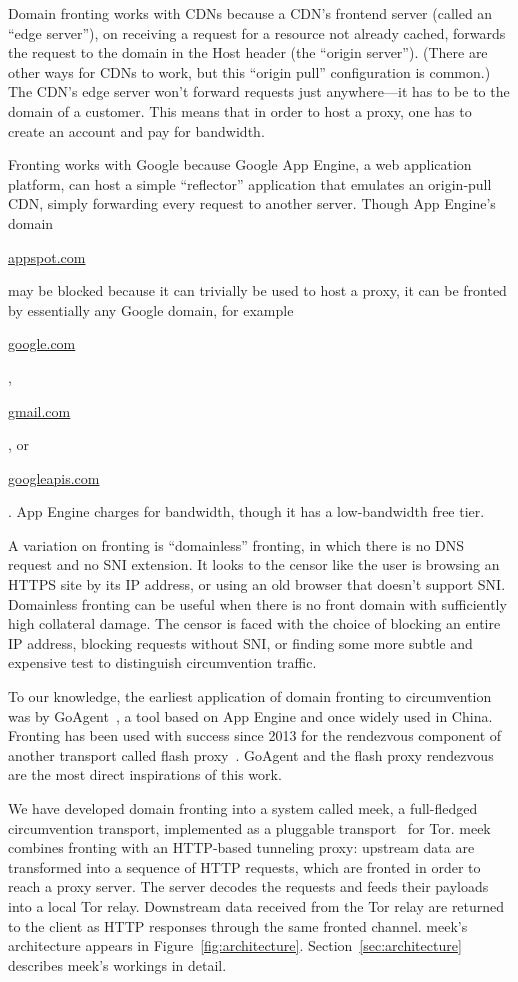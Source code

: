 \documentclass[conference]{IEEEtran}
\def\urll#1{\begin{NoHyper}\url{#1}\end{NoHyper}}
\begin{document}
Domain fronting works with CDNs because a CDN's frontend server
(called an ``edge server''),
on receiving a request for a resource not already cached,
forwards the request to the domain in the Host header
(the ``origin server'').
(There are other ways for CDNs to work, but this ``origin pull''
configuration is common.)
The CDN's edge server won't forward requests just anywhere---it
has to be to the domain of a customer.
This means that in order to host a proxy,
one has to create an account and pay for bandwidth.

Fronting works with Google because Google App Engine, a web application platform,
can host a simple ``reflector'' application that emulates
an origin-pull CDN, simply forwarding every request to another server.
Though App Engine's domain \urll{appspot.com}
may be blocked because it can trivially be used to host a proxy,
it can be fronted by essentially any Google domain, for example
\urll{google.com}, \urll{gmail.com}, or \urll{googleapis.com}.
App Engine charges for bandwidth,
though it has a low-bandwidth free tier.

A variation on fronting is ``domainless'' fronting,
in which there is no DNS request and no SNI extension.
It looks to the censor
like the user is browsing an HTTPS site by its IP address,
or using an old browser that doesn't support SNI.
Domainless fronting can be useful when there is no front domain
with sufficiently high collateral damage.
The censor is faced with the choice of blocking an entire IP address,
blocking requests without SNI,
or finding some more subtle and expensive test to distinguish
circumvention traffic.

To our knowledge,
the earliest application of domain fronting to circumvention
was by GoAgent~\cite{goagent},
a tool based on App Engine and
once widely used in China.
Fronting has been used with success since 2013
for the rendezvous component of another transport called flash proxy~\cite{flashproxy}.
GoAgent and the flash proxy rendezvous are the most direct
inspirations of this work.

We have developed domain fronting into a system called meek,
a full-fledged circumvention transport,
implemented as a pluggable transport~\cite{pt} for Tor.
meek combines fronting with an HTTP-based tunneling proxy:
upstream data are transformed into a sequence of HTTP requests,
which are fronted in order to reach a proxy server.
The server decodes the requests and feeds their payloads
into a local Tor relay.
Downstream data received from the Tor relay
are returned to the client as HTTP responses
through the same fronted channel.
meek's architecture appears in Figure~\ref{fig:architecture}.
Section~\ref{sec:architecture} describes meek's workings in detail.
\end{document}
